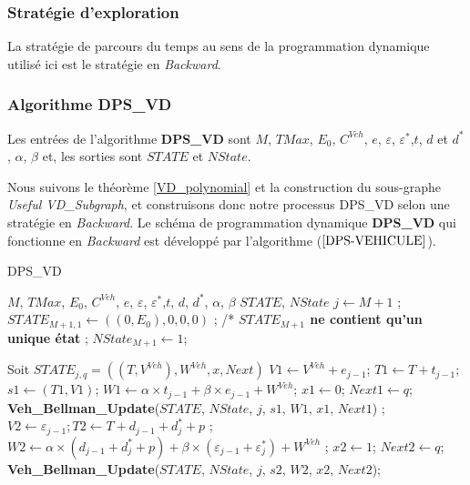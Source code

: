\subsubsection{Stratégie d'exploration}
La stratégie de parcours du temps au sens de la programmation dynamique utilisé ici est le stratégie en \textit{Backward}.
\subsubsection{Algorithme DPS\_VD}


Les entrées de l'algorithme \textbf{DPS\_VD} sont $M$, $TMax$, $E_0$, $C^{Veh}$, $e$, $\varepsilon$, $\varepsilon^*$,$t$, $d$ et $d^*$, $\alpha$, $\beta$ et, les sorties sont  $STATE$ et $NState$.

Nous suivons le théorème \ref{VD_polynomial} et la construction du sous-graphe \textit{Useful VD\_Subgraph}, et construisons donc notre processus DPS\_VD selon une stratégie en \textit{Backward}. Le schéma de programmation dynamique \textbf{DPS\_VD} qui fonctionne en \textit{Backward} est développé par l'algorithme ($\ref{DPS-VEHICULE}$). 

\begin{algorithm} 
	\caption{DPS\_VD}
	\label{DPS-VEHICULE}
	\begin{algorithmic}[1]
		\REQUIRE  $M$, $TMax$, $E_0$, $C^{Veh}$, $e$, $\varepsilon$, $\varepsilon^*$,$t$, $d$, $d^*$, $\alpha$, $\beta$
		\ENSURE $STATE$, $NState$
		\hline
		\vspace{0.5cm}
		\INITIALISATION
		\STATE $j \leftarrow M+1$ ;
		\STATE$STATE_{M+1,1} \leftarrow ((0, E_0), 0, 0, 0)$ ; /* \textbf{$STATE_{M+1}$ ne contient qu'un unique état} ;
		\STATE $NState_{M+1}\leftarrow 1$;
		\vspace{0.3cm}
		
		\BOUCLEPRINCIPAL
		\vspace{0.2cm}
		\STATE Soit $STATE_{j, q} = ((T, V^{Veh}), W^{Veh}, x, Next)$ 
		\STATE $V1 \leftarrow V^{Veh} + e_{j-1}$; $T1 \leftarrow T + t_{j-1}$; $s1 \leftarrow (T1, V1)$; 
		\STATE $W1 \leftarrow \alpha \times t_{j-1}  + \beta \times e_{j-1} + W^{Veh}$; $x1 \leftarrow 0$; $Next1 \leftarrow q$;   
		\STATE \textbf{Veh\_Bellman\_Update}($STATE$, $NState$, $j$, $s1$, $W1$, $x1$, $Next1$) ;
		\ENDIF
		\STATE $V2 \leftarrow \varepsilon_{j-1}; T2 \leftarrow T + d_{j-1} + d^*_j + p$ ;
		\STATE $W2 \leftarrow \alpha \times (d_{j-1} + d^*_j + p) + \beta \times (\varepsilon_{j-1}+ \varepsilon^*_j) +W^{Veh}$ ;
		\STATE$  x2 \leftarrow 1$; $Next2 \leftarrow q$;   
		\STATE \textbf{Veh\_Bellman\_Update}($STATE$, $NState$, $j$, $s2$, $W2$, $x2$, $Next2$);
		\ENDIF
		\ENDFOR
		\ENDFOR	
	\end{algorithmic}
\end{algorithm} 


